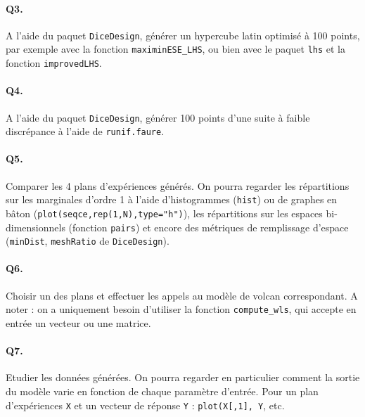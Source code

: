 \documentclass[12pt]{scrartcl}
\begin{document}
\paragraph{Q3.} A l'aide du paquet \texttt{DiceDesign}, générer un hypercube latin optimisé à 100 points, par exemple avec la fonction \texttt{maximinESE\_LHS}, ou bien avec le paquet \texttt{lhs} et la fonction \texttt{improvedLHS}.

\paragraph{Q4.} A l'aide du paquet \texttt{DiceDesign}, générer 100 points d'une suite à faible discrépance à l'aide de \texttt{runif.faure}.

\paragraph{Q5.} Comparer les 4 plans d'expériences générés. 
On pourra regarder les répartitions sur les marginales d'ordre 1 à l'aide d'histogrammes (\texttt{hist}) ou de graphes en bâton (\texttt{plot(seqce,rep(1,N),type="h")}), 
les répartitions sur les espaces bi-dimensionnels (fonction \texttt{pairs}) et encore des métriques de remplissage d'espace (\texttt{minDist}, \texttt{meshRatio} de \texttt{DiceDesign}).

\paragraph{Q6.} Choisir un des plans et effectuer les appels au modèle de volcan correspondant. A noter : on a uniquement besoin d'utiliser la fonction \texttt{compute\_wls}, qui accepte en entrée un vecteur ou une matrice.

\paragraph{Q7.} Etudier les données générées. On pourra regarder en particulier comment la sortie du modèle varie en fonction de chaque paramètre d'entrée. 
Pour un plan d'expériences \texttt{X} et un vecteur de réponse \texttt{Y} : \texttt{plot(X[,1], Y}, etc.
\end{document}
